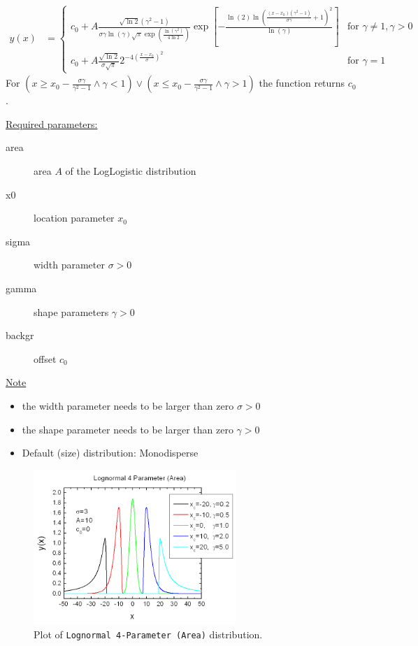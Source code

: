 \begin{align}
y(x) & =
\begin{cases}
c_0+A \frac{\sqrt{\ln 2}(\gamma^2-1)}{\sigma\gamma\ln(\gamma)\sqrt{\pi}\exp\left(\frac{\ln(\gamma^2)}{4\ln 2}\right)}
\exp\left[ - \frac{\ln(2)\ln\left(\frac{(x-x_0)(\gamma^2-1)}{\sigma\gamma}+1\right)^2}{\ln(\gamma)}\right] & \mbox{for } \gamma \neq 1, \gamma > 0 \\
c_0+A \frac{\sqrt{\ln 2}}{\sigma\sqrt{\pi}} 2^{-4\left(\frac{x-x_0}{\sigma}\right)^2} & \mbox{for } \gamma = 1
\end{cases}
\end{align}
For $\left(x \geq x_0-\frac{\sigma\gamma}{\gamma^2-1} \wedge \gamma < 1\right)
\vee \left(x \leq x_0-\frac{\sigma\gamma}{\gamma^2-1} \wedge \gamma > 1\right)$ the function returns $c_0$.
\vspace{2mm}

\uline{Required parameters:}
\begin{description}
    \item[area] area $A$ of the LogLogistic distribution
    \item[x0] location parameter $x_0$
    \item[sigma] width parameter $\sigma > 0$
    \item[gamma] shape parameters $\gamma > 0$
    \item[backgr] offset $c_0$
\end{description}

\uline{Note}
\begin{itemize}
  \item the width parameter needs to be larger than zero $\sigma > 0$
  \item the shape parameter needs to be larger than zero $\gamma > 0$
  \item Default (size) distribution: Monodisperse
\end{itemize}


\begin{figure}[htb]
\begin{center}
\includegraphics[width=0.6824\textwidth]{LogNormal4ParameterArea.png}
\end{center}
\caption{Plot of \texttt{Lognormal 4-Parameter (Area)} distribution.}
\label{fig:LogNormal4ParameterArea}
\end{figure}

